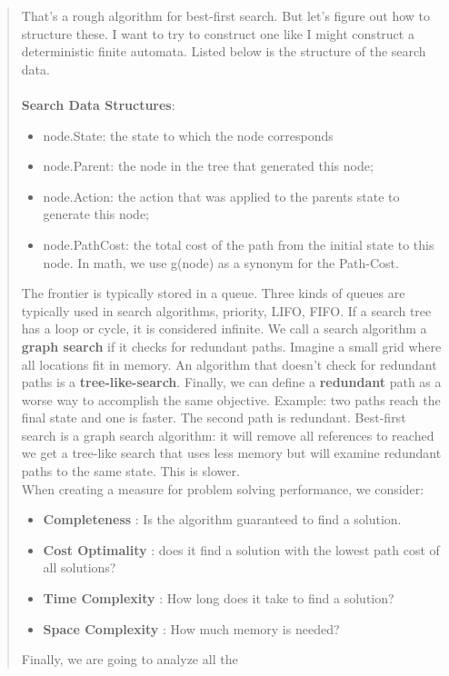 \documentclass{article}
\begin{document}
\begin{quote}
    That's a rough algorithm for best-first search. But let's figure out how to structure these. I want to try to construct one like I might construct a deterministic finite automata. Listed below is the
    structure of the search data. \\
    \\ \textbf{Search Data Structures}:
    \begin{itemize}
        \item node.State: the state to which the node corresponds
        \item node.Parent: the node in the tree that generated this node;
        \item node.Action: the action that was applied to the parents state to generate this node;
        \item node.PathCost: the total cost of the path from the initial state to this node. In math, we use g(node) as a synonym for the Path-Cost.
    \end{itemize}
    The frontier is typically stored in a queue. Three kinds of queues are typically used in search algorithms, priority, LIFO, FIFO. If a search tree has a loop or cycle, it is considered infinite. We call
    a search algorithm a \textbf{graph search} if it checks for redundant paths. Imagine a small grid where all locations fit in memory. An algorithm that doesn't
    check for redundant paths is a \textbf{tree-like-search}. Finally, we can define a \textbf{redundant} path as a worse way to accomplish the same objective. Example: two paths reach the
    final state and one is faster. The second path is redundant. Best-first search is a graph search algorithm: it will remove all references to reached we get a tree-like search that uses less memory but will
    examine redundant paths to the same state. This is slower.
    \\ When creating a measure for problem solving performance, we consider: \\
    \begin{itemize}
        \item \textbf{Completeness} : Is the algorithm guaranteed to find a solution.
        \item  \textbf{Cost Optimality} : does it find a solution with the lowest path cost of all solutions?
        \item \textbf{Time Complexity} : How long does it take to find a solution?
        \item  \textbf{Space Complexity} : How much memory is needed?
    \end{itemize}
    Finally, we are going to analyze all the
\end{quote}
\end{document}
